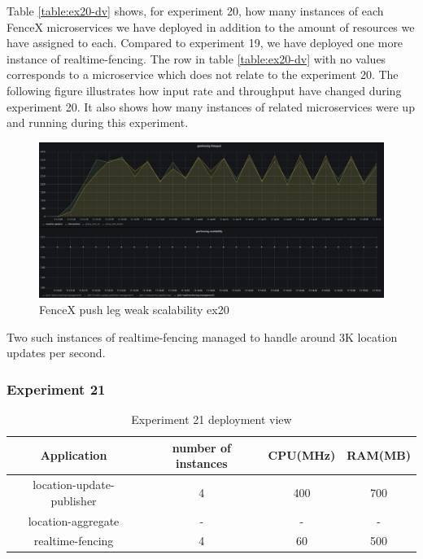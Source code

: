 \documentclass[a4]{report}
\begin{document}
    Table \ref{table:ex20-dv} shows, for experiment 20, how many instances of each FenceX microservices we have
    deployed in addition to the amount of resources we have assigned to each.
    Compared to experiment 19, we have deployed one more instance of realtime-fencing.
    The row in table \ref{table:ex20-dv} with no values corresponds to a microservice which does not relate to the
    experiment 20.
    The following figure illustrates how input rate and throughput have changed during experiment 20.
    It also shows how many instances of related microservices were up and running during this experiment.

    \begin{figure}[h!]
        \centering
        \caption{FenceX push leg weak scalability ex20}
        \label{fig:ex20}
        \includegraphics[width=\linewidth, scale=2]{images/evaluation/ex20-benchmarking-ongoing-1per10sec.png}
    \end{figure}

    Two such instances of realtime-fencing managed to handle around 3K location updates per second.

    \clearpage

    \subsubsection{Experiment 21}
    \begin{table}[h!]
        \centering
        \begin{tabular}{|c|c|c|c|}
            \hline
            Application               & number of instances & CPU(MHz) & RAM(MB) \\
            \hline
            location-update-publisher & 4                   & 400      & 700     \\
            location-aggregate        & -                   & -        & -       \\
            realtime-fencing          & 4                   & 60       & 500     \\
            \hline
        \end{tabular}
        \caption{Experiment 21 deployment view}
        \label{table:ex21-dv}
    \end{table}
\end{document}
